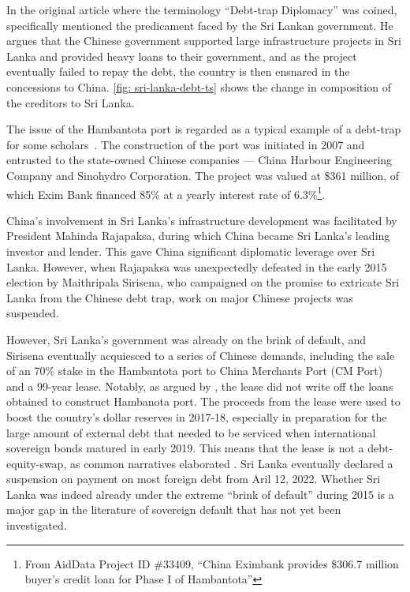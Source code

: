 In the original article where the terminology ``Debt-trap Diplomacy'' was coined, \citet{Chellaney_2017} specifically mentioned the predicament faced by the Sri Lankan government. He argues that the Chinese government supported large infrastructure projects in Sri Lanka and provided heavy loans to their government, and as the project eventually failed to repay the debt, the country is then ensnared in the concessions to China. \autoref{fig: sri-lanka-debt-ts} shows the change in composition of the creditors to Sri Lanka.

The issue of the Hambantota port is regarded as a typical example of a debt-trap for some scholars~\citep*{Moramudali_2020}.
The construction of the port was initiated in 2007 and entrusted to the state-owned Chinese companies --- China Harbour Engineering Company and Sinohydro Corporation. The project was valued at \$361 million, of which Exim Bank financed 85\% at a yearly interest rate of 6.3\%\footnote{From AidData Project ID \#33409, ``China Eximbank provides \$306.7 million buyer's credit loan for Phase I of Hambantota''}.


China's involvement in Sri Lanka's infrastructure development was facilitated by President Mahinda Rajapaksa, during which China became Sri Lanka's leading investor and lender. This gave China significant diplomatic leverage over Sri Lanka. 
However, when Rajapaksa was unexpectedly defeated in the early 2015 election by Maithripala Sirisena, who campaigned on the promise to extricate Sri Lanka from the Chinese debt trap, work on major Chinese projects was suspended.

However, Sri Lanka's government was already on the brink of default, and Sirisena eventually acquiesced to a series of Chinese demands\footnotemark{}, including the sale of an 70\% stake in the Hambantota port to China Merchants Port (CM Port) and a 99-year lease.
Notably, as argued by \citet*{Moramudali_2019}, the lease did not write off the loans obtained to construct Hambanota port. The proceeds from the lease were used to boost the country's dollar reserves in 2017-18, especially in preparation for the large amount of external debt that needed to be serviced when international sovereign bonds matured in early 2019. This means that the lease is not a debt-equity-swap, as common narratives elaborated \citep*{Moramudali_2020}.
Sri Lanka eventually declared a suspension on payment on most foreign debt from Aril 12, 2022. Whether Sri Lanka was indeed already under the extreme ``brink of default'' during 2015 is a major gap in the literature of sovereign default that has not yet been investigated.
